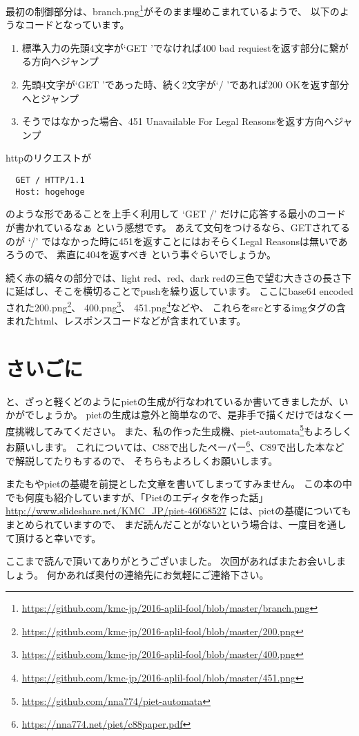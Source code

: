 最初の制御部分は、branch.png\footnote{\url{https://github.com/kmc-jp/2016-aplil-fool/blob/master/branch.png}}がそのまま埋めこまれているようで、
以下のようなコードとなっています。

\begin{enumerate}
  \item 標準入力の先頭4文字が`GET 'でなければ400 bad requiestを返す部分に繋がる方向へジャンプ
  \item 先頭4文字が`GET 'であった時、続く2文字が`/ 'であれば200 OKを返す部分へとジャンプ
  \item そうではなかった場合、451 Unavailable For Legal Reasonsを返す方向へジャンプ
\end{enumerate}

httpのリクエストが
\begin{lstlisting}
  GET / HTTP/1.1
  Host: hogehoge
\end{lstlisting}
のような形であることを上手く利用して `GET /' だけに応答する最小のコードが書かれているなぁ という感想です。
あえて文句をつけるなら、GETされてるのが `/' ではなかった時に451を返すことにはおそらくLegal Reasonsは無いであろうので、
素直に404を返すべき という事ぐらいでしょうか。

続く赤の縞々の部分では、light red、red、dark redの三色で望む大きさの長さ下に延ばし、そこを横切ることでpushを繰り返しています。
ここにbase64 encodedされた200.png\footnote{\url{https://github.com/kmc-jp/2016-aplil-fool/blob/master/200.png}}、
400.png\footnote{\url{https://github.com/kmc-jp/2016-aplil-fool/blob/master/400.png}}、
451.png\footnote{\url{https://github.com/kmc-jp/2016-aplil-fool/blob/master/451.png}}などや、
これらをsrcとするimgタグの含まれたhtml、レスポンスコードなどが含まれています。

\section{さいごに}

と、ざっと軽くどのようにpietの生成が行なわれているか書いてきましたが、いかがでしょうか。
pietの生成は意外と簡単なので、是非手で描くだけではなく一度挑戦してみてください。
また、私の作った生成機、piet-automata\footnote{\url{https://github.com/nna774/piet-automata}}もよろしくお願いします。
これについては、C88で出したペーパー\footnote{\url{https://nna774.net/piet/c88paper.pdf}}、C89で出した本などで解説してたりもするので、
そちらもよろしくお願いします。

またもやpietの基礎を前提とした文章を書いてしまってすみません。
この本の中でも何度も紹介していますが、「Pietのエディタを作った話」
\url{http://www.slideshare.net/KMC_JP/piet-46068527}
には、pietの基礎についてもまとめられていますので、
まだ読んだことがないという場合は、一度目を通して頂けると幸いです。

ここまで読んで頂いてありがとうございました。
次回があればまたお会いしましょう。
何かあれば奥付の連絡先にお気軽にご連絡下さい。
